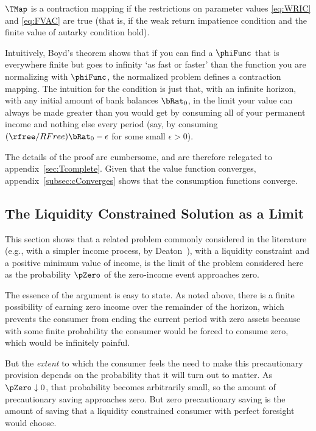\documentclass[BufferStockTheory]{subfiles}
\begin{document}
\hypertarget{MainTheorem}{}
\setcounter{theorem}{0}
\begin{theorem}
  \label{thm:contmap} $\TMap$ is a contraction mapping if
  the restrictions on parameter values \eqref{eq:WRIC} and
  \eqref{eq:FVAC} are true (that is, if the weak return impatience condition and the finite value of autarky condition hold).
\end{theorem}

Intuitively, Boyd's theorem shows that if you can find a $\phiFunc$ that is everywhere finite but goes to infinity `as fast or faster' than the function you are normalizing with $\phiFunc$, the normalized problem defines a contraction mapping.  The intuition for the {\FVAC} condition is just that, with an infinite horizon, with any initial amount of bank balances $\bRat_{0}$, in the limit your value can always be made greater than you would get by consuming all of your permanent income and nothing else every period (say, by consuming $(\rfree/RFree)\bRat_{0}-\epsilon$ for some small $\epsilon>0$).

The details of the proof are cumbersome, and are therefore relegated to
appendix~\ref{sec:Tcomplete}.  Given that the value function
converges, appendix~\ref{subsec:cConverges} shows that the consumption
functions converge.

\hypertarget{The-Liquidity-Constrained-Solution-as-a-Limit}{}
\subsection{The Liquidity Constrained Solution as a Limit} \label{sec:deatonIsLimit}

This section shows that a related problem commonly considered in the
literature (e.g., with a simpler income process, by
Deaton~\citeyearpar{deatonLiqConstr}), with a liquidity constraint
and a positive minimum value of income, is the limit of the problem
considered here as the probability $\pZero$ of the zero-income event
approaches zero.

The essence of the argument is easy to state.  As noted above, there is a finite possibility of earning zero income over the remainder of the horizon, which prevents
the consumer from ending the current period with zero assets because
with some finite probability the consumer would be forced to consume zero,
which would be infinitely painful.

But the \textit{extent} to which the consumer feels the need to make this
precautionary provision depends on the probability that it will turn
out to matter.  As $\pZero \downarrow 0$, that probability becomes
arbitrarily small, so the amount of precautionary saving approaches zero.
But zero precautionary saving is the amount of saving that a liquidity
constrained consumer with perfect foresight would choose.
\end{document}
